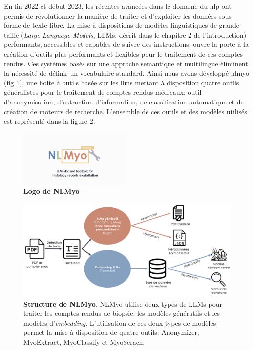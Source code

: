 En fin 2022 et début 2023, les récentes avancées dans le domaine du \gls{nlp} ont permis de révolutionner la manière de traiter et d'exploiter les données sous forme de texte libre. La mise à dispositions de modèles linguistiques de grande taille (\textit{Large Language Models}, LLMs, décrit dans le chapitre 2 de l'introduction) performants, accessibles et capables de suivre des instructions, ouvre la porte à la création d'outils plus performants et flexibles pour le traitement de ces comptes rendus. Ces systèmes basés sur une approche sémantique et multilingue éliminent la nécessité de définir un vocabulaire standard. Ainsi nous avons développé \gls{nlmyo} (fig \ref{fig:nlmyo_logo}), une boite à outils basée sur les \gls{llms} mettant à disposition quatre outils généralistes pour le traitement de comptes rendus médicaux: outil d'anonymisation, d'extraction d'information, de classification automatique et de création de moteurs de recherche. L'ensemble de ces outils et des modèles utilisés est représenté dans la figure \ref{fig:nlmyo_struct}.
\begin{figure}[!ht]
 \centering
 \includegraphics[width=0.5\textwidth]{figures/nlmyo_banner.png}
 \caption[Logo NLMyo]{\textbf{Logo de NLMyo}}
 \label{fig:nlmyo_logo}
\end{figure}
\begin{figure}[!ht]
 \centering
 \includegraphics[width=1\textwidth]{figures/nlmyo_struct.png}
 \caption[Structure de NLMyo]{\textbf{Structure de NLMyo}. NLMyo utilise deux types de LLMs pour traiter les comptes rendus de biopsie: les modèles génératifs et les modèles d'\textit{embedding}. L'utilisation de ces deux types de modèles permet la mise à disposition de quatre outils: Anonymizer, MyoExtract, MyoClassify et MyoSerach.}
 \label{fig:nlmyo_struct}
\end{figure}
